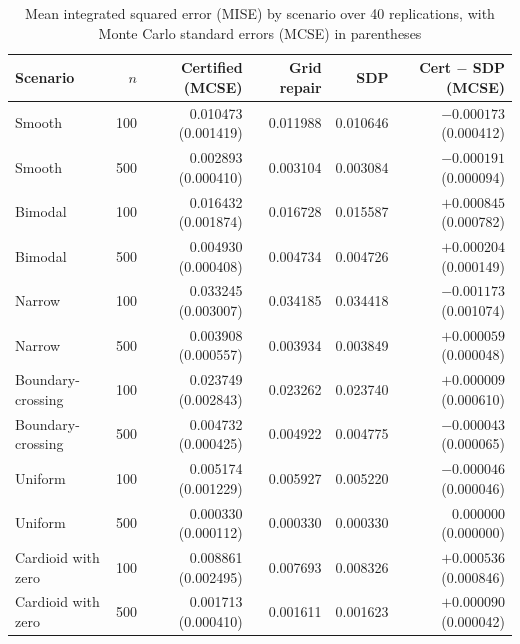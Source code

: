 \begin{table}[htbp]
\centering
\caption{Mean integrated squared error (MISE) by scenario over 40 replications, with Monte Carlo standard errors (MCSE) in parentheses}\label{tab:t1}
\footnotesize
\setlength{\tabcolsep}{3.5pt}
\begin{tabular}{lrrrrr}
\toprule
Scenario & \(n\) & Certified (MCSE) & Grid repair & SDP & Cert \(-\) SDP (MCSE) \\
\midrule
Smooth & 100 & 0.010473 (0.001419) & 0.011988 & 0.010646 & \(-0.000173\) (0.000412) \\
Smooth & 500 & 0.002893 (0.000410) & 0.003104 & 0.003084 & \(-0.000191\) (0.000094) \\
Bimodal & 100 & 0.016432 (0.001874) & 0.016728 & 0.015587 & \(+0.000845\) (0.000782) \\
Bimodal & 500 & 0.004930 (0.000408) & 0.004734 & 0.004726 & \(+0.000204\) (0.000149) \\
Narrow & 100 & 0.033245 (0.003007) & 0.034185 & 0.034418 & \(-0.001173\) (0.001074) \\
Narrow & 500 & 0.003908 (0.000557) & 0.003934 & 0.003849 & \(+0.000059\) (0.000048) \\
Boundary-crossing & 100 & 0.023749 (0.002843) & 0.023262 & 0.023740 & \(+0.000009\) (0.000610) \\
Boundary-crossing & 500 & 0.004732 (0.000425) & 0.004922 & 0.004775 & \(-0.000043\) (0.000065) \\
Uniform & 100 & 0.005174 (0.001229) & 0.005927 & 0.005220 & \(-0.000046\) (0.000046) \\
Uniform & 500 & 0.000330 (0.000112) & 0.000330 & 0.000330 & \(0.000000\) (0.000000) \\
Cardioid with zero & 100 & 0.008861 (0.002495) & 0.007693 & 0.008326 & \(+0.000536\) (0.000846) \\
Cardioid with zero & 500 & 0.001713 (0.000410) & 0.001611 & 0.001623 & \(+0.000090\) (0.000042) \\
\bottomrule
\end{tabular}
\end{table}

